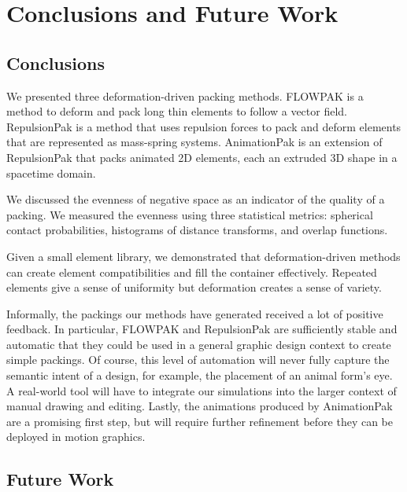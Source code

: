 
\chapter{Conclusions and Future Work}
\label{chapter_conclusions_and_future_work}

\section{Conclusions}

\newtext
{
We presented three deformation-driven packing methods.
FLOWPAK is a method to deform and pack long thin elements to follow a vector field.
RepulsionPak is a method that uses repulsion forces to pack and deform
elements that are represented as mass-spring systems.
AnimationPak is an extension of RepulsionPak that packs animated 2D elements,
each an extruded 3D shape in a spacetime domain.
}

\newtext
{We discussed the evenness of negative space as an indicator of the quality of a packing.
We measured the evenness using three statistical metrics:
spherical contact probabilities, histograms of distance transforms, and overlap functions.
}

\newtext
{
Given a small element library, 
we demonstrated that deformation-driven methods can create element compatibilities
and fill the container effectively.
Repeated elements give a sense of uniformity but deformation creates a sense of variety.
}

\nnewtext
{
Informally, the packings our methods have generated received a lot of positive feedback. 
In particular, FLOWPAK and RepulsionPak are sufficiently stable and automatic that they could be used in a general graphic design context to create simple packings. Of course, this level of automation will never fully capture the semantic intent of a design, 
for example, the placement of an animal form's eye. 
A real-world tool will have to integrate our simulations into the larger context of manual drawing and editing. 
Lastly, the animations produced by AnimationPak are a promising first step, 
but will require further refinement before they can be deployed in motion graphics.
}

\section{Future Work}

